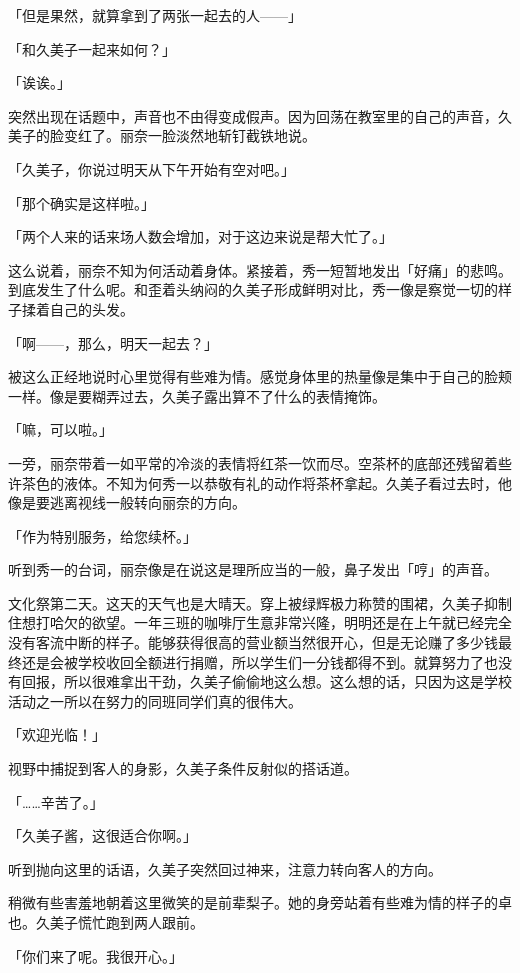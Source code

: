\documentclass[UTF8]{ctexart}
\begin{document}
    「但是果然，就算拿到了两张一起去的人——」

    「和久美子一起来如何？」

    「诶诶。」

    突然出现在话题中，声音也不由得变成假声。因为回荡在教室里的自己的声音，久美子的脸变红了。丽奈一脸淡然地斩钉截铁地说。

    「久美子，你说过明天从下午开始有空对吧。」

    「那个确实是这样啦。」

    「两个人来的话来场人数会增加，对于这边来说是帮大忙了。」

    这么说着，丽奈不知为何活动着身体。紧接着，秀一短暂地发出「好痛」的悲鸣。到底发生了什么呢。和歪着头纳闷的久美子形成鲜明对比，秀一像是察觉一切的样子揉着自己的头发。

    「啊——，那么，明天一起去？」

    被这么正经地说时心里觉得有些难为情。感觉身体里的热量像是集中于自己的脸颊一样。像是要糊弄过去，久美子露出算不了什么的表情掩饰。

    「嘛，可以啦。」

    一旁，丽奈带着一如平常的冷淡的表情将红茶一饮而尽。空茶杯的底部还残留着些许茶色的液体。不知为何秀一以恭敬有礼的动作将茶杯拿起。久美子看过去时，他像是要逃离视线一般转向丽奈的方向。

    「作为特别服务，给您续杯。」

    听到秀一的台词，丽奈像是在说这是理所应当的一般，鼻子发出「哼」的声音。

    文化祭第二天。这天的天气也是大晴天。穿上被绿辉极力称赞的围裙，久美子抑制住想打哈欠的欲望。一年三班的咖啡厅生意非常兴隆，明明还是在上午就已经完全没有客流中断的样子。能够获得很高的营业额当然很开心，但是无论赚了多少钱最终还是会被学校收回全额进行捐赠，所以学生们一分钱都得不到。就算努力了也没有回报，所以很难拿出干劲，久美子偷偷地这么想。这么想的话，只因为这是学校活动之一所以在努力的同班同学们真的很伟大。

    「欢迎光临！」

    视野中捕捉到客人的身影，久美子条件反射似的搭话道。

    「……辛苦了。」

    「久美子酱，这很适合你啊。」

    听到抛向这里的话语，久美子突然回过神来，注意力转向客人的方向。

    稍微有些害羞地朝着这里微笑的是前辈梨子。她的身旁站着有些难为情的样子的卓也。久美子慌忙跑到两人跟前。

    「你们来了呢。我很开心。」
\end{document}
